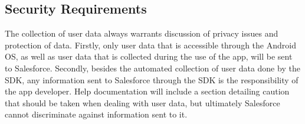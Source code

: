 \documentclass[12pt,oneside,letterpaper]{article}
\begin{document}
\subsection{Security Requirements}
The collection of user data always warrants discussion of privacy issues and protection of data. Firstly, only user data that is accessible through the Android OS, as well as user data that is collected during the use of the app, will be sent to Salesforce. Secondly, besides the automated collection of user data done by the SDK, any information sent to Salesforce through the SDK is the responsibility of the app developer. Help documentation will include a section detailing caution that should be taken when dealing with user data, but ultimately Salesforce cannot discriminate against information sent to it.
\end{document}
